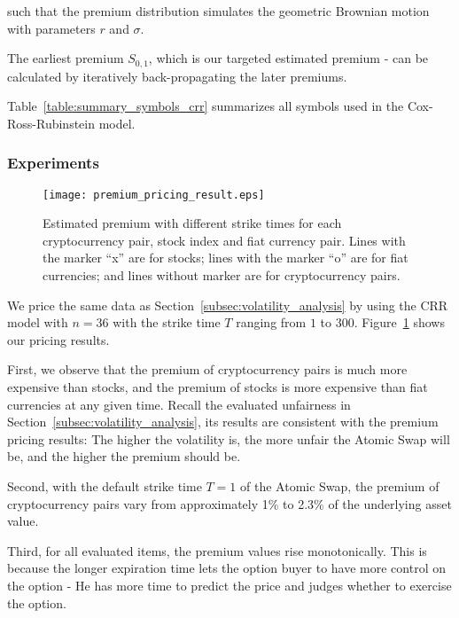 such that the premium distribution simulates the geometric Brownian motion with parameters $r$ and $\sigma$.

The earliest premium $S_{0, 1}$, which is our targeted estimated premium - can be calculated by iteratively back-propagating the later premiums.

Table~\ref{table:summary_symbols_crr} summarizes all symbols used in the Cox-Ross-Rubinstein model. 

\subsubsection{Experiments}

\begin{figure}
    \texttt{[image: premium\_pricing\_result.eps]}
    \caption{Estimated premium with different strike times for each cryptocurrency pair, stock index and fiat currency pair. Lines with the marker ``x'' are for stocks; lines with the marker ``o'' are for fiat currencies; and lines without marker are for cryptocurrency pairs.}
    \label{fig:premium_pricing_result}
\end{figure}

We price the same data as Section~\ref{subsec:volatility_analysis} by using the CRR model with $n = 36$ with the strike time $T$ ranging from $1$ to $300$.
Figure~\ref{fig:premium_pricing_result} shows our pricing results.

First, we observe that the premium of cryptocurrency pairs is much more expensive than stocks, and the premium of stocks is more expensive than fiat currencies at any given time.
Recall the evaluated unfairness in Section~\ref{subsec:volatility_analysis}, its results are consistent with the premium pricing results: The higher the volatility is, the more unfair the Atomic Swap will be, and the higher the premium should be.

Second, with the default strike time $T = 1$ of the Atomic Swap, the premium of cryptocurrency pairs vary from approximately 1\% to 2.3\% of the underlying asset value.

Third, for all evaluated items, the premium values rise monotonically.
This is because the longer expiration time lets the option buyer to have more control on the option - He has more time to predict the price and judges whether to exercise the option.